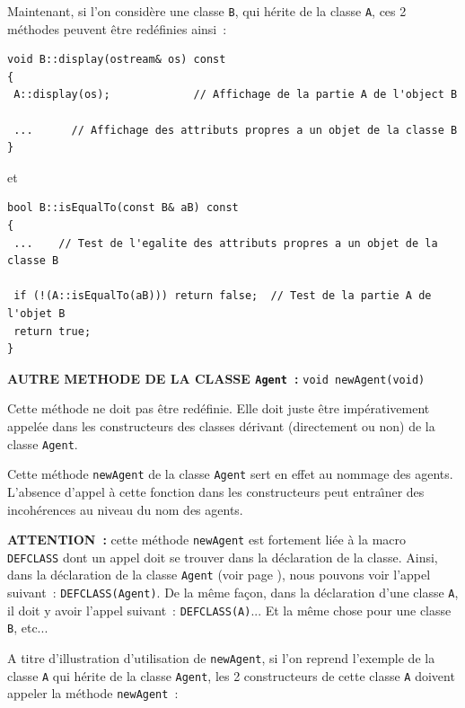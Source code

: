 \documentclass[12pt]{article}
\begin{document}
Maintenant, si l'on consid\`ere une classe {\tt B}, qui h\'erite de la
classe {\tt A}, ces 2 m\'ethodes peuvent \^etre red\'efinies ainsi~:
\begin{footnotesize}
\begin{verbatim}
void B::display(ostream& os) const
{
 A::display(os);             // Affichage de la partie A de l'object B

 ...      // Affichage des attributs propres a un objet de la classe B
}
\end{verbatim}
\end{footnotesize}
\vspace{-0.15cm}
et
\vspace{-0.15cm}
\begin{footnotesize}
\begin{verbatim}
bool B::isEqualTo(const B& aB) const
{
 ...    // Test de l'egalite des attributs propres a un objet de la classe B

 if (!(A::isEqualTo(aB))) return false;  // Test de la partie A de l'objet B
 return true;
}
\end{verbatim}
\end{footnotesize}


{\bf AUTRE METHODE DE LA CLASSE {\tt Agent}~:} {\tt void newAgent(void)}

\vspace{0.2cm}

Cette m\'ethode ne doit pas \^etre red\'efinie.
Elle doit juste \^etre imp\'erativement appel\'ee dans les constructeurs
des classes d\'erivant (directement ou non) de la classe {\tt Agent}.

Cette m\'ethode {\tt newAgent} de la classe {\tt Agent} sert en effet
au nommage des agents.
L'absence d'appel \`a cette fonction dans les constructeurs peut
entra\^ \i ner des incoh\'erences au niveau du nom des agents.

\vspace{0.2cm}

{\bf ATTENTION~:} cette m\'ethode {\tt newAgent} est fortement li\'ee
\`a la macro {\tt DEFCLASS} dont un appel doit se trouver dans la
d\'eclaration de la classe. 
Ainsi, dans la d\'eclaration de la classe {\tt Agent}
(voir page \pageref{Agent}),
nous pouvons voir l'appel suivant~: {\tt DEFCLASS(Agent)}.
De la m\^eme fa\c con, dans la d\'eclaration d'une classe {\tt A},
il doit y avoir l'appel suivant~: {\tt DEFCLASS(A)}... Et la m\^eme
chose pour une classe {\tt B}, etc...

\vspace{0.2cm}
A titre d'illustration d'utilisation de {\tt newAgent},
si l'on reprend l'exemple de la classe {\tt A} qui h\'erite
de la classe {\tt Agent}, les 2 constructeurs de cette classe {\tt A}
doivent appeler la m\'ethode {\tt newAgent}~:
\end{document}
